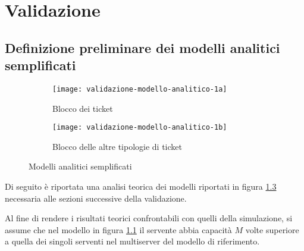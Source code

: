 \chapter{Validazione}\label{chp:validazione}
\section{Definizione preliminare dei modelli analitici semplificati}
\begin{figure}[ht]
\centering
\begin{subfigure}[b]{0.475\textwidth}  
\centering 
\texttt{[image: validazione-modello-analitico-1a]}
\caption{Blocco dei ticket \sr{}}    
\label{fig:validazione-modello-analitico-1a}
\end{subfigure}
\hfill 
\begin{subfigure}[b]{0.475\textwidth}
\centering
\texttt{[image: validazione-modello-analitico-1b]}
\caption{Blocco delle altre tipologie di ticket}    
\label{fig:validazione-modello-analitico-1b}
\end{subfigure}
\caption{Modelli analitici semplificati}
\label{fig:validazione-modello-analitico-1}
\end{figure}

Di seguito è riportata una analisi teorica dei modelli riportati in figura \ref{fig:validazione-modello-analitico-1} necessaria alle sezioni successive della validazione.

Al fine di rendere i risultati teorici confrontabili con quelli della simulazione, si assume che nel modello in figura \ref{fig:validazione-modello-analitico-1a} il servente abbia capacità $M$ volte superiore a quella dei singoli serventi nel multiserver del modello di riferimento.

\newpage
